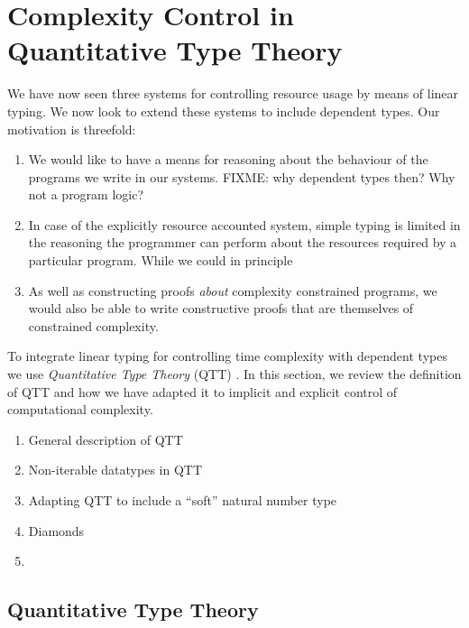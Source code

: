 \documentclass[acmsmall,review]{acmart}
\begin{document}
\section{Complexity Control in Quantitative Type Theory}
\label{sec:qtt}

We have now seen three systems for controlling resource usage by means
of linear typing. We now look to extend these systems to include
dependent types. Our motivation is threefold:
\begin{enumerate}
\item We would like to have a means for reasoning about the behaviour
  of the programs we write in our systems. FIXME: why dependent types
  then? Why not a program logic?
\item In case of the explicitly resource accounted system, simple
  typing is limited in the reasoning the programmer can perform about
  the resources required by a particular program. While we could in
  principle
\item As well as constructing proofs \emph{about} complexity
  constrained programs, we would also be able to write constructive
  proofs that are themselves of constrained complexity.
\end{enumerate}

To integrate linear typing for controlling time complexity with
dependent types we use \emph{Quantitative Type Theory} (QTT)
\cite{atkey18qtt}. In this section, we review the definition of QTT
and how we have adapted it to implicit and explicit control of
computational complexity.

\begin{enumerate}
\item General description of QTT
\item Non-iterable datatypes in QTT
\item Adapting QTT to include a ``soft'' natural number type
\item Diamonds
\item
\end{enumerate}

\subsection{Quantitative Type Theory}
\end{document}
